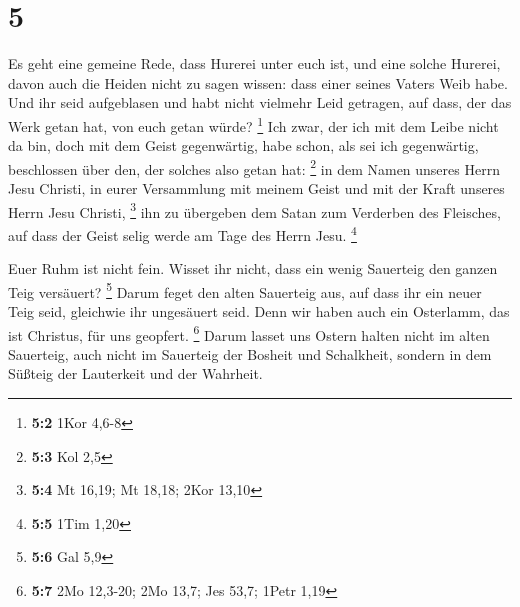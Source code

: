 \hypertarget{section-2}{%
\section{5}\label{section-2}}

 Es geht eine gemeine Rede, dass Hurerei unter euch ist,
und eine solche Hurerei, davon auch die Heiden nicht zu sagen wissen:
dass einer seines Vaters Weib habe.  Und ihr seid
aufgeblasen und habt nicht vielmehr Leid getragen, auf dass, der das
Werk getan hat, von euch getan würde? \footnote{\textbf{5:2} 1Kor 4,6-8}
 Ich zwar, der ich mit dem Leibe nicht da bin, doch mit
dem Geist gegenwärtig, habe schon, als sei ich gegenwärtig, beschlossen
über den, der solches also getan hat: \footnote{\textbf{5:3} Kol 2,5}
 in dem Namen unseres Herrn Jesu Christi, in eurer
Versammlung mit meinem Geist und mit der Kraft unseres Herrn Jesu
Christi, \footnote{\textbf{5:4} Mt 16,19; Mt 18,18; 2Kor 13,10}
 ihn zu übergeben dem Satan zum Verderben des Fleisches,
auf dass der Geist selig werde am Tage des Herrn Jesu. \footnote{\textbf{5:5}
  1Tim 1,20}

 Euer Ruhm ist nicht fein. Wisset ihr nicht, dass ein
wenig Sauerteig den ganzen Teig versäuert? \footnote{\textbf{5:6} Gal
  5,9}  Darum feget den alten Sauerteig aus, auf dass ihr
ein neuer Teig seid, gleichwie ihr ungesäuert seid. Denn wir haben auch
ein Osterlamm, das ist Christus, für uns geopfert. \footnote{\textbf{5:7}
  2Mo 12,3-20; 2Mo 13,7; Jes 53,7; 1Petr 1,19}  Darum
lasset uns Ostern halten nicht im alten Sauerteig, auch nicht im
Sauerteig der Bosheit und Schalkheit, sondern in dem Süßteig der
Lauterkeit und der Wahrheit.

